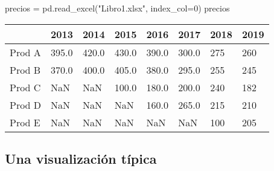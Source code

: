 \documentclass[
  letterpaper,
  DIV=11,
  numbers=noendperiod]{scrreprt}
\newenvironment{Shaded}{\begin{snugshade}}{\end{snugshade}}
\newcommand{\DecValTok}[1]{\textcolor[rgb]{0.68,0.00,0.00}{#1}}
\newcommand{\NormalTok}[1]{\textcolor[rgb]{0.00,0.23,0.31}{#1}}
\newcommand{\OperatorTok}[1]{\textcolor[rgb]{0.37,0.37,0.37}{#1}}
\newcommand{\StringTok}[1]{\textcolor[rgb]{0.13,0.47,0.30}{#1}}
\begin{document}
\begin{Shaded}
\begin{Highlighting}[]
\NormalTok{precios }\OperatorTok{=}\NormalTok{ pd.read\_excel(}\StringTok{"Libro1.xlsx"}\NormalTok{, index\_col}\OperatorTok{=}\DecValTok{0}\NormalTok{)}
\NormalTok{precios}
\end{Highlighting}
\end{Shaded}

\begin{longtable}[]{@{}llllllll@{}}
\toprule\noalign{}
& 2013 & 2014 & 2015 & 2016 & 2017 & 2018 & 2019 \\
\midrule\noalign{}
\endhead
\bottomrule\noalign{}
\endlastfoot
Prod A & 395.0 & 420.0 & 430.0 & 390.0 & 300.0 & 275 & 260 \\
Prod B & 370.0 & 400.0 & 405.0 & 380.0 & 295.0 & 255 & 245 \\
Prod C & NaN & NaN & 100.0 & 180.0 & 200.0 & 240 & 182 \\
Prod D & NaN & NaN & NaN & 160.0 & 265.0 & 215 & 210 \\
Prod E & NaN & NaN & NaN & NaN & NaN & 100 & 205 \\
\end{longtable}

\subsection{Una visualización
típica}\label{una-visualizaciuxf3n-tuxedpica}
\end{document}
